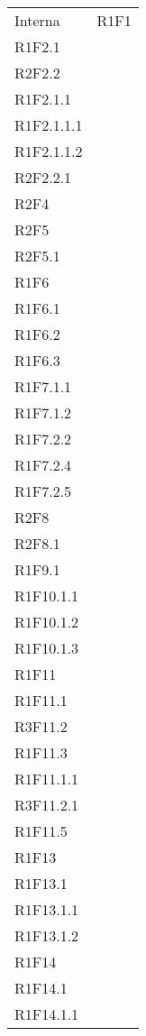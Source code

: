 \begin{longtable}{|C{6.5cm}|C{6.5cm}|}
	Interna & 
	\centering
	R1F1\\
	R1F2.1 \\
	R2F2.2\\
	R1F2.1.1\\
	R1F2.1.1.1\\
	R1F2.1.1.2\\
	R2F2.2.1\\
	R2F4\\
	R2F5\\
	R2F5.1\\
	R1F6\\
	R1F6.1\\
	R1F6.2\\
	R1F6.3\\
	R1F7.1.1\\
	R1F7.1.2\\
	R1F7.2.2\\
	R1F7.2.4\\
	R1F7.2.5\\
	R2F8\\
	R2F8.1\\
	R1F9.1\\
	R1F10.1.1\\
	R1F10.1.2\\
	R1F10.1.3\\
	R1F11\\
	R1F11.1\\
	R3F11.2\\
	R1F11.3\\
	R1F11.1.1\\
	R3F11.2.1\\
	R1F11.5\\
	R1F13\\
	R1F13.1\\
	R1F13.1.1\\
	R1F13.1.2\\
	R1F14\\
	R1F14.1\\
	R1F14.1.1\\

	
\end{longtable}